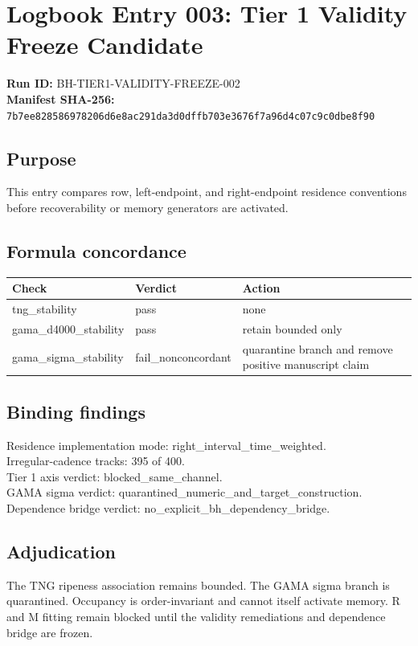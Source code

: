 \documentclass[11pt]{article}
\begin{document}
\section*{Logbook Entry 003: Tier 1 Validity Freeze Candidate}
\textbf{Run ID:} BH-TIER1-VALIDITY-FREEZE-002\\
\textbf{Manifest SHA-256:} \texttt{7b7ee828586978206d6e8ac291da3d0dffb703e3676f7a96d4c07c9c0dbe8f90}
\subsection*{Purpose}
This entry compares row, left-endpoint, and right-endpoint residence conventions before recoverability or memory generators are activated.
\subsection*{Formula concordance}
\begin{tabular}{lll}\toprule Check & Verdict & Action \\\midrule
tng\_stability & pass & none \\
gama\_d4000\_stability & pass & retain bounded only \\
gama\_sigma\_stability & fail\_nonconcordant & quarantine branch and remove positive manuscript claim \\
\bottomrule\end{tabular}
\subsection*{Binding findings}
Residence implementation mode: right\_interval\_time\_weighted.\\
Irregular-cadence tracks: 395 of 400.\\
Tier 1 axis verdict: blocked\_same\_channel.\\
GAMA sigma verdict: quarantined\_numeric\_and\_target\_construction.\\
Dependence bridge verdict: no\_explicit\_bh\_dependency\_bridge.
\subsection*{Adjudication}
The TNG ripeness association remains bounded. The GAMA sigma branch is quarantined. Occupancy is order-invariant and cannot itself activate memory. R and M fitting remain blocked until the validity remediations and dependence bridge are frozen.
\end{document}
